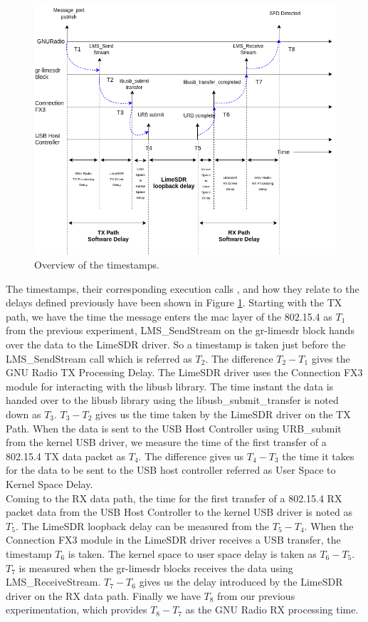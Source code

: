  \begin{figure}[h!]
\centering
\includegraphics[width=\textwidth]{Thesis/Figure/Timepoints.png}
\caption{Overview of the timestamps.}
\label{time_points}
\end{figure}

The timestamps, their corresponding execution calls , and how they relate to the delays defined previously have been shown in Figure \ref{time_points}. 
Starting with the TX path, we have the time the message enters the \ac{mac} layer of the 802.15.4 as $T_1$ from the previous experiment, LMS\_SendStream on the gr-limesdr block hands over the data to the LimeSDR driver.
So a timestamp is taken just before the LMS\_SendStream call which is referred as $T_2$.
The difference $T_2 - T_1$ gives the GNU Radio TX Processing Delay.
The LimeSDR driver uses the Connection FX3 module for interacting with the libusb library.
The time instant the data is handed over to the libusb library using the libusb\_submit\_transfer is noted down as $T_3$.
$T_3 - T_2$ gives us the time taken by the LimeSDR driver on the TX Path.
When the data is sent to the USB Host Controller using URB\_submit from the kernel \ac{USB} driver, we measure the time of the first transfer of a 802.15.4 TX data packet as $T_4$.
The difference gives us $T_4 - T_3$ the time it takes for the data to be sent to the USB host controller referred as User Space to Kernel Space Delay.\\

Coming to the RX data path, the time for the first transfer of a 802.15.4 RX packet data from the USB Host Controller to the kernel \ac{USB} driver is noted as $T_5$.
The LimeSDR loopback delay can be measured from the $T_5 - T_4$.
When the Connection FX3 module in the LimeSDR driver receives a USB transfer, the timestamp $T_6$ is taken.
The kernel space to user space delay is taken as $T_6 - T_5$.
$T_7$ is measured when the gr-limesdr blocks receives the data using LMS\_ReceiveStream.
$T_7 - T_6$ gives us the delay introduced by the LimeSDR driver on the RX data path.
Finally we have $T_8$ from our previous experimentation, which provides $T_8 - T_7$ as the GNU Radio RX processing time.\\



